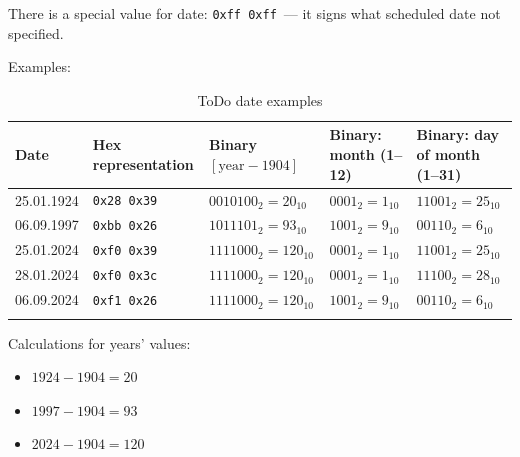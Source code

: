 \documentclass[a4paper,12pt,oneside]{scrartcl}
\begin{document}
There is a special value for date: \texttt{0xff 0xff}~--- it signs what
scheduled date not specified.

Examples:
\begin{longtable}[H]{|p{2cm}|p{3cm}|p{3.3cm}|p{2.5cm}|p{3cm}|}
  \hline
  \textbf{Date}
  & \textbf{Hex representation}
  & \textbf{Binary }$[\mbox{year} - 1904]$
  & \textbf{Binary: month (1--12)}
  & \textbf{Binary: day of month (1--31)} \\
  \hline
  25.01.1924
  & \texttt{0x28 0x39}
  & $0010 100_2 = 20_{10}$
  & $0001_2 = 1_{10}$
  & $11001_{2} = 25_{10}$ \\
  \hline
  06.09.1997
  & \texttt{0xbb 0x26}
  & $1011 101_2 = 93_{10}$
  & $1001_2 = 9_{10}$
  & $00110_2 = 6_{10}$ \\
  \hline
  25.01.2024
  & \texttt{0xf0 0x39}
  & $1111 000_2 = 120_{10}$
  & $0001_2 = 1_{10}$
  & $11001_2 = 25_{10}$ \\
  \hline
  28.01.2024
  & \texttt{0xf0 0x3c}
  & $1111 000_2 = 120_{10}$
  & $0001_2 = 1_{10}$
  & $11100_2 = 28_{10}$ \\
  \hline
  06.09.2024
  & \texttt{0xf1 0x26}
  & $1111 000_2 = 120_{10}$
  & $1001_2 = 9_{10}$
  & $00110_2 = 6_{10}$ \\
  \hline
  \caption{ToDo date examples}
  \label{tab:todo-date-examples}
\end{longtable}

Calculations for years' values:
\begin{itemize}
\item $1924 - 1904 = 20$
\item $1997 - 1904 = 93$
\item $2024 - 1904 = 120$
\end{itemize}

\end{document}
